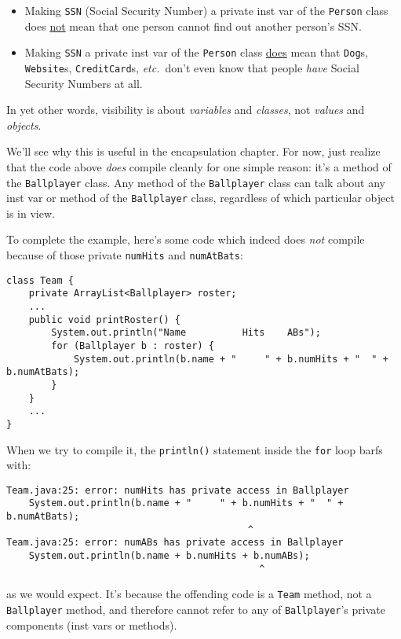 \begin{itemize}
\itemsep.1em
\item Making \texttt{SSN} (Social Security Number) a private inst var of the
\texttt{Person} class does \underline{not} mean that one person cannot find
out another person's SSN.
\item Making \texttt{SSN} a private inst var of the \texttt{Person} class
\underline{does} mean that \texttt{Dog}s, \texttt{Website}s,
\texttt{CreditCard}s, \textit{etc.}~don't even know that people \textit{have}
Social Security Numbers at all.
\end{itemize}

In yet other words, visibility is about \textit{variables} and
\textit{classes}, not \textit{values} and \textit{objects}.

We'll see why this is useful in the encapsulation chapter. For now, just
realize that the code above \textit{does} compile cleanly for one simple
reason: it's a method of the \texttt{Ballplayer} class. Any method of the
\texttt{Ballplayer} class can talk about any inst var or method of the
\texttt{Ballplayer} class, regardless of which particular object is in view.

To complete the example, here's some code which indeed does \textit{not}
compile because of those private \texttt{numHits} and \texttt{numAtBats}:

\begin{Verbatim}[fontsize=\footnotesize,samepage=true,frame=single]
class Team {
    private ArrayList<Ballplayer> roster;
    ...    
    public void printRoster() {
        System.out.println("Name          Hits    ABs");
        for (Ballplayer b : roster) {
            System.out.println(b.name + "     " + b.numHits + "  " + b.numAtBats);
        }
    }
    ...
}
\end{Verbatim}

\begin{samepage}
When we try to compile it, the \texttt{println()} statement inside the
\texttt{for} loop barfs with:
\footnotesize
\begin{verbatim}
Team.java:25: error: numHits has private access in Ballplayer
    System.out.println(b.name + "     " + b.numHits + "  " + b.numAtBats);
                                           ^
Team.java:25: error: numABs has private access in Ballplayer
    System.out.println(b.name + b.numHits + b.numABs);
                                             ^
\end{verbatim}
\normalsize
\vspace{-.2in}
as we would expect. It's because the offending code is a \texttt{Team} method,
not a \texttt{Ballplayer} method, and therefore cannot refer to any of
\texttt{Ballplayer}'s private components (inst vars or methods).
\end{samepage}

